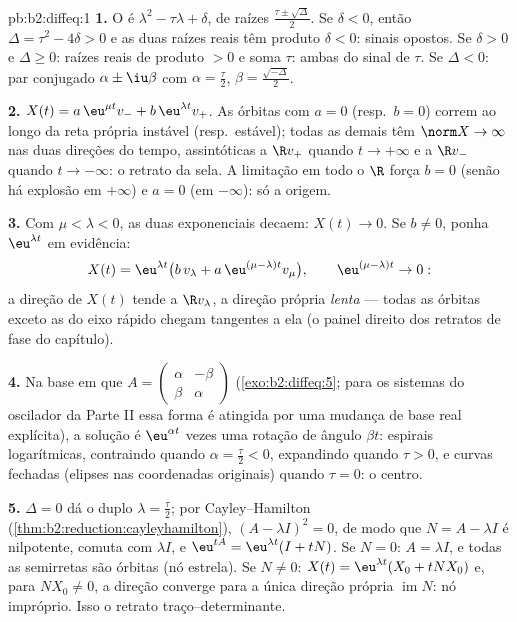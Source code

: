 \begin{solution}{pb:b2:diffeq:1}
\textbf{1.} O  é $\lambda^2 -
\tau\lambda + \delta$, de raízes
$\frac{\tau\pm\sqrt\Delta}{2}$. Se $\delta < 0$, então $\Delta =
\tau^2 - 4\delta > 0$ e as duas raízes reais têm produto
$\delta < 0$: sinais opostos. Se $\delta > 0$ e $\Delta \geq
0$: raízes reais de produto $> 0$ e soma $\tau$: ambas do
sinal de $\tau$. Se $\Delta < 0$: par conjugado $\alpha \pm
\iu\beta$ com $\alpha = \frac\tau2$, $\beta =
\frac{\sqrt{-\Delta}}2$.

\textbf{2.} $X(t) = a\,\eu^{\mu t}v_- + b\,\eu^{\lambda t}v_+$.
As órbitas com $a = 0$ (resp.\ $b = 0$) correm ao longo da reta própria
instável (resp.\ estável); todas as demais têm $\norm X \to \infty$
nas duas direções do tempo, assintóticas a $\R v_+$ quando $t \to
+\infty$ e a $\R v_-$ quando $t \to -\infty$: o retrato da
sela. A limitação em todo o $\R$ força $b = 0$ (senão há
explosão em $+\infty$) e $a = 0$ (em $-\infty$): só a
origem.

\textbf{3.} Com $\mu < \lambda < 0$, as duas exponenciais decaem:
$X(t) \to 0$. Se $b \neq 0$, ponha $\eu^{\lambda t}$ em evidência:
\[
X(t) = \eu^{\lambda t}\bigl(b\,v_\lambda + a\,\eu^{(\mu -
\lambda)t}v_\mu\bigr),
\qquad \eu^{(\mu-\lambda)t} \to 0 :
\]
a direção de $X(t)$ tende a $\R v_\lambda$, a direção
própria \emph{lenta} --- todas as órbitas exceto as do eixo rápido
chegam tangentes a ela (o painel direito dos retratos de fase
do capítulo).

\textbf{4.} Na base em que $A = \begin{pmatrix} \alpha &
-\beta\\ \beta & \alpha\end{pmatrix}$
(\cref{exo:b2:diffeq:5}; para os sistemas do oscilador da Parte II
essa forma é atingida por uma mudança de base real explícita), a
solução é $\eu^{\alpha t}$ vezes uma rotação de ângulo $\beta
t$: espirais logarítmicas, contraindo quando $\alpha = \frac\tau2
< 0$, expandindo quando $\tau > 0$, e curvas fechadas (elipses
nas coordenadas originais) quando $\tau = 0$: o centro.

\textbf{5.} $\Delta = 0$ dá o  duplo $\lambda =
\frac\tau2$; por Cayley--Hamilton
(\cref{thm:b2:reduction:cayleyhamilton}), $(A - \lambda I)^2 =
0$, de modo que $N = A - \lambda I$ é nilpotente, comuta com
$\lambda I$, e $\eu^{tA} = \eu^{\lambda t}(I + tN)$. Se $N =
0$: $A = \lambda I$, e todas as semirretas são órbitas (nó estrela). Se $N
\neq 0$: $X(t) = \eu^{\lambda t}(X_0 + tNX_0)$ e, para $NX_0
\neq 0$, a direção converge para a única direção própria
$\operatorname{im}N$: nó impróprio. Isso  o
retrato traço--determinante.


\end{solution}
